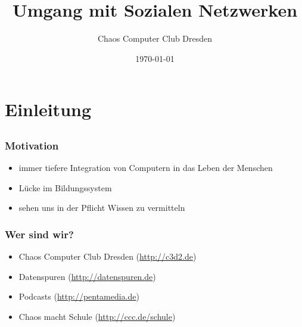 \documentclass{beamer}
\title{Umgang mit Sozialen Netzwerken}
\author{Chaos Computer Club Dresden}
\date{\today}
\begin{document}
\maketitle

\frame{\tableofcontents[hideallsubsections]}

\section{Einleitung}
\subsection{}

\begin{frame}
  \frametitle{Motivation}
  \begin{itemize}
    \item<2-> immer tiefere Integration von Computern in das Leben der Menschen
    \item<3-> Lücke im Bildungssystem
    \item<4-> sehen uns in der Pflicht Wissen zu vermitteln
  \end{itemize}
\end{frame}

\begin{frame}
  \frametitle{Wer sind wir?}
  \begin{itemize}
    \item<2-> Chaos Computer Club Dresden (\url{http://c3d2.de})
      \note{}
    \item<3-> Datenspuren (\url{http://datenspuren.de})
    \item<4-> Podcasts (\url{http://pentamedia.de})
    \item<5-> Chaos macht Schule (\url{http://ccc.de/schule})
  \end{itemize}
\end{frame}
\end{document}
